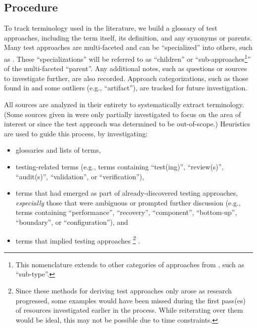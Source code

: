 \subsection{Procedure}

To track terminology used in the literature, we build a glossary of test
approaches, including the term itself, its definition, and
any synonyms or parents. Many test approaches are multi-faceted and can be
``specialized'' into others, such as . These
``specializations'' will be referred to as ``children'' or
``sub-approaches\footnote{This nomenclature extends to other categories of
    approaches from , such as ``sub-type''.}''
of the multi-faceted
``parent''. Any additional notes, such as questions or sources to investigate
further, are also recorded. Approach categorizations, such as those found in
 and some outliers (e.g., ``artifact''), are tracked
for future investigation.

All sources are analyzed in their entirety to systematically extract
terminology. (Some sources given in 
were only partially investigated to focus on the area of interest or since
the test approach was determined to be out-of-scope.)
Heuristics are used to guide this process, by investigating:

\begin{itemize}
    \item glossaries and lists of terms,
    \item testing-related terms (e.g., terms containing ``test(ing)'',
          \ifnotpaper ``review(s)'', ``audit(s)'', \fi
          ``validation'', or ``verification''),
    \item terms that had emerged as part of already-discovered
          testing approaches, \emph{especially} those that were ambiguous
          or prompted further discussion (e.g., terms containing
          ``performance'', ``recovery'', ``component'', ``bottom-up'',
          \ifnotpaper ``boundary'', \fi or ``configuration''), and
    \item terms that implied testing approaches%
          \ifnotpaper\footnote{
                  Since these methods for deriving test approaches only arose
                  as research progressed, some examples would have been missed
                  during the first pass(es) of resources investigated earlier
                  in the process. While reiterating over them would be ideal,
                  this may not be possible due to time constraints.
              }\fi%
          .
\end{itemize}

